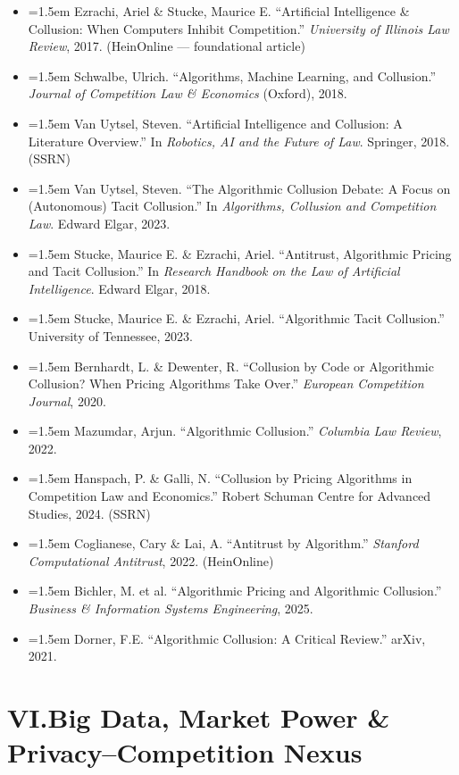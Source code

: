 \documentclass[12pt, letterpaper]{article}
\newcommand{\entry}[1]{%
  \item \hangindent=1.5em \hangafter=1 #1%
}
\begin{document}
\begin{itemize}
\entry{Ezrachi, Ariel \& Stucke, Maurice E. ``Artificial Intelligence \& Collusion: When Computers Inhibit Competition.'' \textit{University of Illinois Law Review}, 2017. (HeinOnline --- foundational article)}
\entry{Schwalbe, Ulrich. ``Algorithms, Machine Learning, and Collusion.'' \textit{Journal of Competition Law \& Economics} (Oxford), 2018.}
\entry{Van Uytsel, Steven. ``Artificial Intelligence and Collusion: A Literature Overview.'' In \textit{Robotics, AI and the Future of Law}. Springer, 2018. (SSRN)}
\entry{Van Uytsel, Steven. ``The Algorithmic Collusion Debate: A Focus on (Autonomous) Tacit Collusion.'' In \textit{Algorithms, Collusion and Competition Law}. Edward Elgar, 2023.}
\entry{Stucke, Maurice E. \& Ezrachi, Ariel. ``Antitrust, Algorithmic Pricing and Tacit Collusion.'' In \textit{Research Handbook on the Law of Artificial Intelligence}. Edward Elgar, 2018.}
\entry{Stucke, Maurice E. \& Ezrachi, Ariel. ``Algorithmic Tacit Collusion.'' University of Tennessee, 2023.}
\entry{Bernhardt, L. \& Dewenter, R. ``Collusion by Code or Algorithmic Collusion? When Pricing Algorithms Take Over.'' \textit{European Competition Journal}, 2020.}
\entry{Mazumdar, Arjun. ``Algorithmic Collusion.'' \textit{Columbia Law Review}, 2022.}
\entry{Hanspach, P. \& Galli, N. ``Collusion by Pricing Algorithms in Competition Law and Economics.'' Robert Schuman Centre for Advanced Studies, 2024. (SSRN)}
\entry{Coglianese, Cary \& Lai, A. ``Antitrust by Algorithm.'' \textit{Stanford Computational Antitrust}, 2022. (HeinOnline)}
\entry{Bichler, M. et al. ``Algorithmic Pricing and Algorithmic Collusion.'' \textit{Business \& Information Systems Engineering}, 2025.}
\entry{Dorner, F.E. ``Algorithmic Collusion: A Critical Review.'' arXiv, 2021.}
\end{itemize}

\section{VI.\quad Big Data, Market Power \& Privacy--Competition Nexus}
\end{document}
